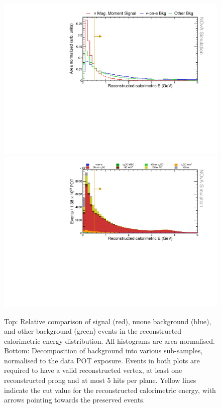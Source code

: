 \begin{figure}[hbtp]
\centering
\includegraphics[width=.9\textwidth]{Plots/NuMMEventSelection/N1Cut_calELow.pdf}
\includegraphics[width=.9\textwidth]{Plots/NuMMEventSelection/N1Cut_calELow_BkgDecomp.pdf}
\caption[Low calorimetric energy cut for reconstruction quality]{Top: Relative comparison of signal (red), \acrshort{nuone} background (blue), and other background (green) events in the reconstructed calorimetric energy distribution. All histograms are area-normalised. Bottom: Decomposition of background into various sub-samples, normalised to the data \acrshort{POT} exposure. Events in both plots are required to have a valid reconstructed vertex, at least one reconstructed prong and at most $5$ hits per plane. Yellow lines indicate the cut value for the reconstructed calorimetric energy, with arrows pointing towards the preserved events.}
\label{fig:NuMMCutsLowCalE}
\end{figure}

